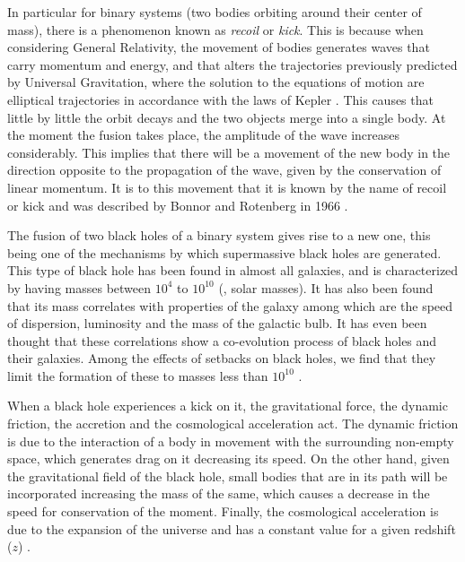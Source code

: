 	In particular for binary systems (two bodies orbiting around their center of mass), there is a phenomenon known as \textit{recoil} or \textit{kick}. This is because when considering General Relativity, the movement of bodies generates waves that carry momentum and energy, and that alters the trajectories previously predicted by Universal Gravitation, where the solution to the equations of motion are elliptical trajectories in accordance with the laws of Kepler \cite{hughes2005black, hoyng2006gravitational, brugmann2018fundamentals}. This causes that little by little the orbit decays and the two objects merge into a single body. At the moment the fusion takes place, the amplitude of the wave increases considerably. This implies that there will be a movement of the new body in the direction opposite to the propagation of the wave, given by the conservation of linear momentum. It is to this movement that it is known by the name of recoil or kick and was described by Bonnor and Rotenberg in 1966 \cite{hughes2005black, bonnor1966gravitational}.
	
	The fusion of two black holes of a binary system gives rise to a new one, this being one of the mechanisms by which supermassive black holes are generated. This type of black hole has been found in almost all galaxies, and is characterized by having masses between $10^4$ \sm to $10^{10}$ \sm (\sm, solar masses). It has also been found that its mass correlates with properties of the galaxy among which are the speed of dispersion, luminosity and the mass of the galactic bulb. It has even been thought that these correlations show a co-evolution process of black holes and their galaxies. Among the effects of setbacks on black holes, we find that they limit the formation of these to masses less than $10^{10}$ \sm \cite{choksi2017recoiling}.
	
	When a black hole experiences a kick on it, the gravitational force, the dynamic friction, the accretion and the cosmological acceleration act. The dynamic friction is due to the interaction of a body in movement with the surrounding non-empty space, which generates drag on it decreasing its speed. On the other hand, given the gravitational field of the black hole, small bodies that are in its path will be incorporated increasing the mass of the same, which causes a decrease in the speed for conservation of the moment. Finally, the cosmological acceleration is due to the expansion of the universe and has a constant value for a given redshift ($z$) \cite{choksi2017recoiling}.
	
